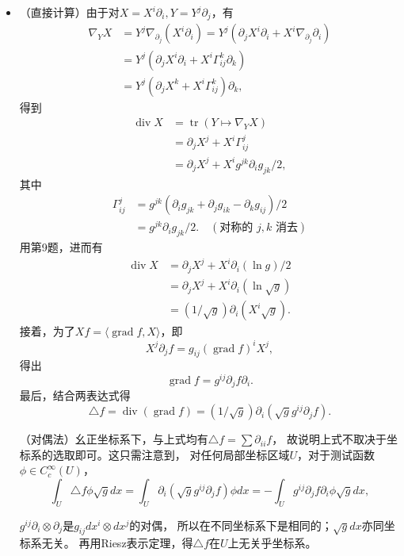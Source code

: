 \begin{itemize}
    \item[Pf.] （直接计算）由于对$X=X^i\partial_i,Y=Y^j\partial_j$，有
    \begin{align*}
        \nabla_YX&=Y^j\nabla_{\partial_j}(X^i\partial_i)
        =Y^j(\partial_jX^i\partial_i+X^i\nabla_{\partial_j}\partial_i)\\
        &=Y^j(\partial_jX^i\partial_i+X^i\Gamma_{ij}^k\partial_k)\\
        &=Y^j(\partial_jX^k+X^i\Gamma_{ij}^k)\partial_k,
    \end{align*}
    得到
    \begin{align*}
        \operatorname{div}X&=\operatorname{tr}(Y\mapsto\nabla_YX)\\
        &=\partial_jX^j+X^i\Gamma_{ij}^j\\
        &=\partial_jX^j+X^ig^{jk}\partial_ig_{jk}/2,
    \end{align*}
    其中
    \begin{align*}
        \Gamma_{ij}^j&=g^{jk}(\partial_ig_{jk}+\partial_jg_{ik}-\partial_kg_{ij})/2\\
        &=g^{jk}\partial_ig_{jk}/2.\quad(\text{对称的 }j,k\text{ 消去})
    \end{align*}
    用第9题，进而有
    \begin{align*}
        \operatorname{div}X&=\partial_jX^j+X^i\partial_i(\ln g)/2\\
        &=\partial_jX^j+X^i\partial_i(\ln\sqrt{g})\\
        &=(1/\sqrt{g})\partial_i(X^i\sqrt{g}).
    \end{align*}
    接着，为了$Xf=\langle\operatorname{grad}f,X\rangle$，即
    \[X^j\partial_jf=g_{ij}(\operatorname{grad}f)^iX^j,\]
    得出
    \[\operatorname{grad}f=g^{ij}\partial_jf\partial_i.\]
    最后，结合两表达式得
    \[\triangle f=\operatorname{div}(\operatorname{grad}f)
    =(1/\sqrt{g})\partial_i(\sqrt{g}g^{ij}\partial_jf).\]
    
    （对偶法）幺正坐标系下，\cite{Xin}与上式均有$\triangle f=\sum\partial_{ii}f$，
    故说明上式不取决于坐标系的选取即可。这只需注意到，
    对任何局部坐标区域$U$，对于测试函数$\phi\in C_c^\infty(U)$，
    \[\int_U\triangle f\phi\sqrt{g}dx
    =\int_U\partial_i(\sqrt{g}g^{ij}\partial_jf)\phi dx
    =-\int_U g^{ij}\partial_jf\partial_i\phi\sqrt{g}dx,\]

    $g^{ij}\partial_i\otimes\partial_j$是$g_{ij}dx^i\otimes dx^j$的对偶，
    所以在不同坐标系下是相同的；$\sqrt{g}dx$亦同坐标系无关。
    再用Riesz表示定理，得$\triangle f$在$U$上无关乎坐标系。


\end{itemize}
